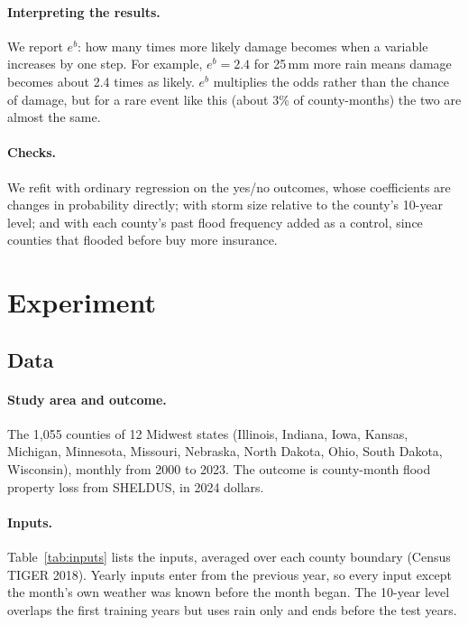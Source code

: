 \documentclass[10pt,twocolumn]{article}
\begin{document}
\paragraph{Interpreting the results.} We report $e^b$: how many times more likely damage becomes when a variable increases by one step. For example, $e^b = 2.4$ for 25\,mm more rain means damage becomes about 2.4 times as likely. $e^b$ multiplies the odds rather than the chance of
damage, but for a rare event like this (about 3\% of county-months) the two are almost the same. 

\paragraph{Checks.} We refit with ordinary regression on the yes/no outcomes, whose coefficients
are changes in probability directly; with storm size relative to the county's 10-year level; and with each county's past flood frequency added as a control, since
counties that flooded before buy more insurance.


\section{Experiment}
\subsection{Data}

\paragraph{Study area and outcome.} The 1,055 counties of 12 Midwest states (Illinois, Indiana,
Iowa, Kansas, Michigan, Minnesota, Missouri, Nebraska, North Dakota, Ohio, South Dakota,
Wisconsin), monthly from 2000 to 2023. The outcome is county-month flood property loss from
SHELDUS, in 2024 dollars.

\paragraph{Inputs.} Table~\ref{tab:inputs} lists the inputs, averaged over each county boundary (Census TIGER 2018). Yearly inputs enter from the previous year, so every input except the month's own weather was known before the month began. The 10-year level overlaps the first training years but uses rain only and ends before the test years.
\end{document}
